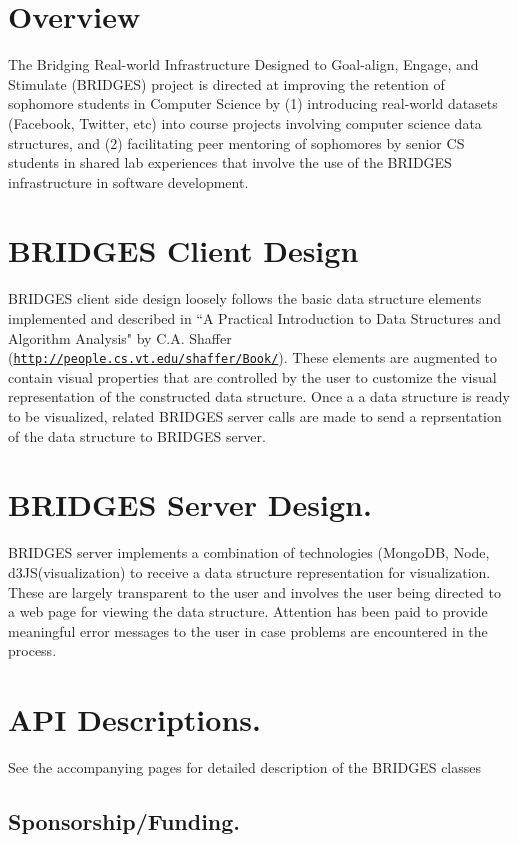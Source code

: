 \hypertarget{index_overview_sec}{}\section{Overview}\label{index_overview_sec}
The Bridging Real-\/world Infrastructure Designed to Goal-\/align, Engage, and Stimulate (B\+R\+I\+D\+G\+ES) project is directed at improving the retention of sophomore students in Computer Science by (1) introducing real-\/world datasets (Facebook, Twitter, etc) into course projects involving computer science data structures, and (2) facilitating peer mentoring of sophomores by senior CS students in shared lab experiences that involve the use of the B\+R\+I\+D\+G\+ES infrastructure in software development. \hypertarget{index_br_client}{}\section{B\+R\+I\+D\+G\+E\+S Client Design}\label{index_br_client}
B\+R\+I\+D\+G\+ES client side design loosely follows the basic data structure elements implemented and described in ``A Practical Introduction to Data Structures and Algorithm Analysis" by C.\+A. Shaffer (\href{http://people.cs.vt.edu/shaffer/Book/}{\tt http\+://people.\+cs.\+vt.\+edu/shaffer/\+Book/}). These elements are augmented to contain visual properties that are controlled by the user to customize the visual representation of the constructed data structure. Once a a data structure is ready to be visualized, related B\+R\+I\+D\+G\+ES server calls are made to send a reprsentation of the data structure to B\+R\+I\+D\+G\+ES server. \hypertarget{index_br_server}{}\section{B\+R\+I\+D\+G\+E\+S Server Design.}\label{index_br_server}
B\+R\+I\+D\+G\+ES server implements a combination of technologies (Mongo\+DB, Node, d3\+J\+S(visualization) to receive a data structure representation for visualization. These are largely transparent to the user and involves the user being directed to a web page for viewing the data structure. Attention has been paid to provide meaningful error messages to the user in case problems are encountered in the process. \hypertarget{index_api_sec}{}\section{A\+P\+I Descriptions.}\label{index_api_sec}
See the accompanying pages for detailed description of the B\+R\+I\+D\+G\+ES classes \hypertarget{index_sponsor_sec}{}\subsection{Sponsorship/\+Funding.}\label{index_sponsor_sec}
